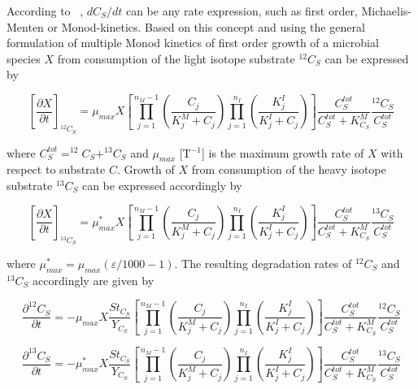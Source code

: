 According to ~\cite{VanBr:05}, $dC_S/dt$ can be any rate expression, such as first order, Michaelis-Menten or Monod-kinetics. Based on this concept and using the general formulation of multiple Monod kinetics of first order growth of a microbial species $X$ from consumption of the light isotope substrate $^{12}C_S$ can be expressed by

\begin{equation}
    \left[
    \frac{\partial X}{\partial t}
    \right]_{^{12}C_S}
    = \mu_{max} X\left[
    \prod_{j=1}^{n_M-1} \left( \frac{C_j}{K_{j}^M + C_j} \right)
    \prod_{j=1}^{n_I} \left( \frac{K_{j}^I}{K_{j}^I + C_j} \right)
    \right]
    \frac{C_S^{tot}}{C_S^{tot} + K_{C_S}^M}
    \frac{^{12}C_S}{C_S^{tot}}
    \label{iso_monod_light}
\end{equation}

where $C_S^{tot} = ^{12}C_S+^{13}C_S$ and $\mu_{max}$ [T$^{-1}$] is the maximum growth rate of $X$ with respect to substrate $C$. Growth of $X$ from consumption of the heavy isotope substrate $^{13}C_S$ can be expressed accordingly by


\begin{equation}
        \left[
    \frac{\partial X}{\partial t}
    \right]_{^{13}C_S}
    = \mu_{max}^{\ast} X\left[
    \prod_{j=1}^{n_M-1} \left( \frac{C_j}{K_{j}^M + C_j} \right)
    \prod_{j=1}^{n_I} \left( \frac{K_{j}^I}{K_{j}^I + C_j} \right)
    \right]
    \frac{C_S^{tot}}{C_S^{tot} + K_{C_S}^M}
    \frac{^{13}C_S}{C_S^{tot}}
    \label{iso_monod_heavy}
\end{equation}

where $\mu_{max}^{\ast}= \mu_{max}(\varepsilon/1000 -1)$. The resulting degradation rates of $^{12}C_S$ and $^{13}C_S$ accordingly are given by

\begin{equation}
    \frac{\partial ^{12}C_S}{\partial t} = -\mu_{max} X\frac{St_{C_S}}{Y_{C_S}}
    \left[
    \prod_{j=1}^{n_M-1} \left( \frac{C_j}{K_{j}^M + C_j} \right)
    \prod_{j=1}^{n_I} \left( \frac{K_{j}^I}{K_{j}^I + C_j} \right)
    \right]
    \frac{C_S^{tot}}{C_S^{tot} + K_{C_S}^M}
    \frac{^{12}C_S}{C_S^{tot}}
    \label{iso_monod_sub_light}
\end{equation}

\begin{equation}
    \frac{\partial ^{13}C_S}{\partial t} = -\mu_{max}^{\ast} X\frac{St_{C_S}}{Y_{C_S}}
    \left[
    \prod_{j=1}^{n_M-1} \left( \frac{C_j}{K_{j}^M + C_j} \right)
    \prod_{j=1}^{n_I} \left( \frac{K_{j}^I}{K_{j}^I + C_j} \right)
    \right]
    \frac{C_S^{tot}}{C_S^{tot} + K_{C_S}^M}
    \frac{^{13}C_S}{C_S^{tot}}
    \label{iso_monod_sub_heavy}
\end{equation}

